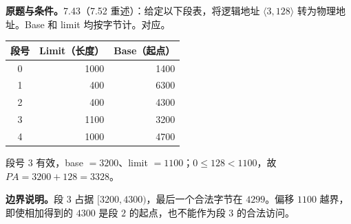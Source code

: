 \nopagebreak[4]
\textbf{原题与条件。}7.43（7.52 重述）：给定以下段表，将逻辑地址 $\langle3,128\rangle$ 转为物理地址。Base 和 limit 均按字节计。对应。
\begin{center}
\begin{tabular}{@{}crr@{}}
\toprule
段号 & Limit（长度） & Base（起点） \\
\midrule
0 & 1000 & 1400 \\
1 & 400 & 6300 \\
2 & 400 & 4300 \\
3 & 1100 & 3200 \\
4 & 1000 & 4700 \\
\bottomrule
\end{tabular}
\end{center}
\begin{checkedsolution}
段号 $3$ 有效，base $=3200$、limit $=1100$；$0\le128<1100$，故 $PA=3200+128=\boxed{3328}$。

\textbf{边界说明。}段 $3$ 占据 $[3200,4300)$，最后一个合法字节在 $4299$。偏移 $1100$ 越界，即使相加得到的 $4300$ 是段 $2$ 的起点，也不能作为段 $3$ 的合法访问。
\end{checkedsolution}
\endgroup
